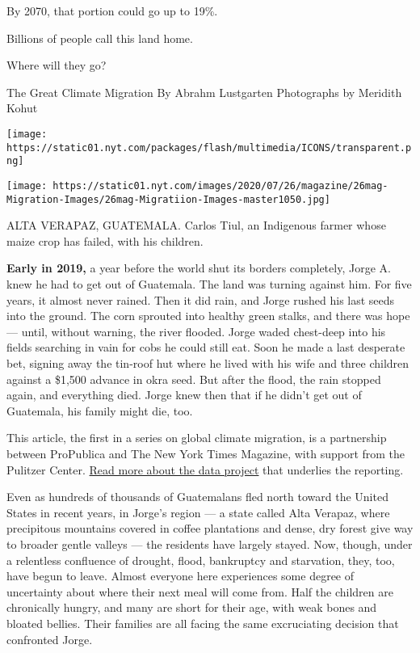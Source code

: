 By 2070, that portion could go up to 19\%.

Billions of people call this land home.

Where will they go?

The Great Climate Migration By Abrahm Lustgarten \textbar{} Photographs
by Meridith Kohut

\texttt{[image: https://static01.nyt.com/packages/flash/multimedia/ICONS/transparent.png]}

\texttt{[image: https://static01.nyt.com/images/2020/07/26/magazine/26mag-Migration-Images/26mag-Migratiion-Images-master1050.jpg]}

ALTA VERAPAZ, GUATEMALA. Carlos Tiul, an Indigenous farmer whose maize
crop has failed, with his children.

\textbf{Early in 2019,} a year before the world shut its borders
completely, Jorge A. knew he had to get out of Guatemala. The land was
turning against him. For five years, it almost never rained. Then it did
rain, and Jorge rushed his last seeds into the ground. The corn sprouted
into healthy green stalks, and there was hope --- until, without
warning, the river flooded. Jorge waded chest-deep into his fields
searching in vain for cobs he could still eat. Soon he made a last
desperate bet, signing away the tin-roof hut where he lived with his
wife and three children against a \$1,500 advance in okra seed. But
after the flood, the rain stopped again, and everything died. Jorge knew
then that if he didn't get out of Guatemala, his family might die, too.

This article, the first in a series on global climate migration, is a
partnership between ProPublica and The New York Times Magazine, with
support from the Pulitzer Center.
\href{https://www.propublica.org/article/2020-climate-migration-part-1-methodology}{Read
more about the data project} that underlies the reporting.

Even as hundreds of thousands of Guatemalans fled north toward the
United States in recent years, in Jorge's region --- a state called Alta
Verapaz, where precipitous mountains covered in coffee plantations and
dense, dry forest give way to broader gentle valleys --- the residents
have largely stayed. Now, though, under a relentless confluence of
drought, flood, bankruptcy and starvation, they, too, have begun to
leave. Almost everyone here experiences some degree of uncertainty about
where their next meal will come from. Half the children are chronically
hungry, and many are short for their age, with weak bones and bloated
bellies. Their families are all facing the same excruciating decision
that confronted Jorge.

